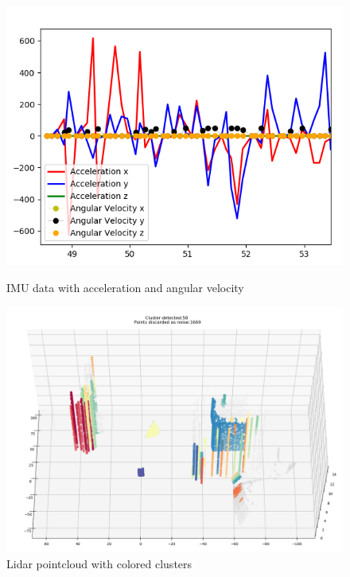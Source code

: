  \begin{figure}[!htb]
 	\begin{minipage}[t]{0.48\textwidth}
 		\centering
 		\includegraphics[width=.99\linewidth]{Bilder/IMU.png}
 		\caption{IMU data with acceleration and angular velocity}\label{fig_IMU}
 	\end{minipage}\hfill
 		\begin{minipage}[t]{0.48\textwidth}
		\centering
		\includegraphics[width=.99\linewidth]{Bilder/LidarCluster.png}
		\caption{Lidar pointcloud with colored clusters}\label{fig_lidarMat}
	\end{minipage}
	
\end{figure}


